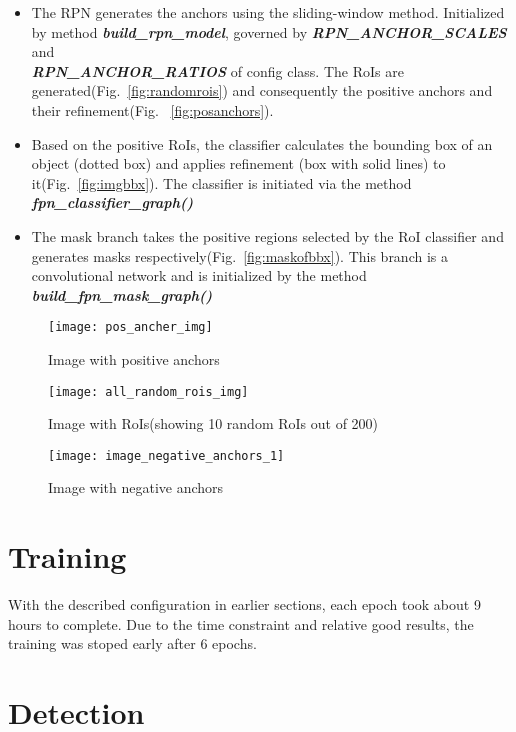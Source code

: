 \begin{itemize}
\item The RPN generates the anchors using the sliding-window method. Initialized by method \textbf{\textit{build\_rpn\_model}}, governed by \textbf{\textit{RPN\_ANCHOR\_SCALES}} and \\ \textbf{\textit{RPN\_ANCHOR\_RATIOS}} of config class. The RoIs are generated(Fig.~\ref{fig:randomrois}) and consequently the positive anchors and their refinement(Fig. ~\ref{fig:posanchors}). 
\item Based on the positive RoIs, the classifier calculates the bounding box of an object (dotted box) and applies refinement (box with solid lines) to it(Fig.~\ref{fig:imgbbx}). The classifier is initiated via the method \textbf{\textit{fpn\_classifier\_graph()}}
\item The mask branch takes the positive regions selected by the RoI classifier and generates masks respectively(Fig.~\ref{fig:maskofbbx}). This branch is a convolutional network and is initialized by the method \textbf{\textit{build\_fpn\_mask\_graph()}}
\end{itemize}
\begin{figure}[!htb]
  \texttt{[image: pos\_ancher\_img]}
  \caption[Image with positive anchors]{Image with positive anchors}\label{fig:posanchors}
\endminipage\hfill
{}
  \texttt{[image: all\_random\_rois\_img]}
  \caption[Image with random RoIs]{Image with RoIs(showing 10 random RoIs out of 200)}\label{fig:randomrois}
\endminipage\hfill
{}
  \texttt{[image: image\_negative\_anchors\_1]}
  \caption[Image with negative anchors]{Image with negative anchors}\label{fig:neganchors}
\endminipage
\end{figure}
\newpage
\section{Training}
\label{sec:training}
With the described configuration in earlier sections, each epoch took about 9 hours to complete. Due to the time constraint and relative good results, the training was stoped early after 6 epochs. 

\section{Detection}
\label{sec:detection}

